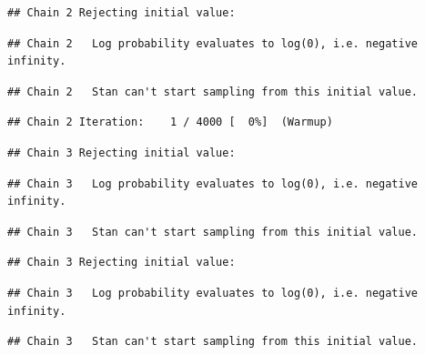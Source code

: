 \documentclass[
]{article}
\begin{document}
\begin{verbatim}
## Chain 2 Rejecting initial value:
\end{verbatim}

\begin{verbatim}
## Chain 2   Log probability evaluates to log(0), i.e. negative infinity.
\end{verbatim}

\begin{verbatim}
## Chain 2   Stan can't start sampling from this initial value.
\end{verbatim}

\begin{verbatim}
## Chain 2 Iteration:    1 / 4000 [  0%]  (Warmup)
\end{verbatim}

\begin{verbatim}
## Chain 3 Rejecting initial value:
\end{verbatim}

\begin{verbatim}
## Chain 3   Log probability evaluates to log(0), i.e. negative infinity.
\end{verbatim}

\begin{verbatim}
## Chain 3   Stan can't start sampling from this initial value.
\end{verbatim}

\begin{verbatim}
## Chain 3 Rejecting initial value:
\end{verbatim}

\begin{verbatim}
## Chain 3   Log probability evaluates to log(0), i.e. negative infinity.
\end{verbatim}

\begin{verbatim}
## Chain 3   Stan can't start sampling from this initial value.
\end{verbatim}
\end{document}
